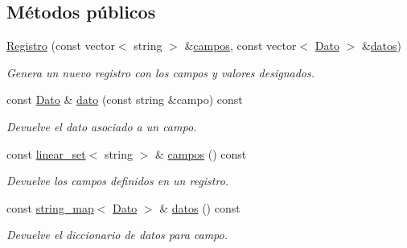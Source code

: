\subsection*{Métodos públicos}
\begin{DoxyCompactItemize}
\item 
\hyperlink{classRegistro_af3717314d0e658a463ffd8ac5b073441}{Registro} (const vector$<$ string $>$ \&\hyperlink{classRegistro_af082664a69c70eb5d29dcad6522242fc}{campos}, const vector$<$ \hyperlink{classDato}{Dato} $>$ \&\hyperlink{classRegistro_a332ce24bb26d794783172cf9fc327b8b}{datos})
\begin{DoxyCompactList}\small\item\em Genera un nuevo registro con los campos y valores designados. \end{DoxyCompactList}\item 
const \hyperlink{classDato}{Dato} \& \hyperlink{classRegistro_a5191c0af2f375525601819cfbb477287}{dato} (const string \&campo) const 
\begin{DoxyCompactList}\small\item\em Devuelve el dato asociado a un campo. \end{DoxyCompactList}\item 
const \hyperlink{classlinear__set}{linear\-\_\-set}$<$ string $>$ \& \hyperlink{classRegistro_af082664a69c70eb5d29dcad6522242fc}{campos} () const 
\begin{DoxyCompactList}\small\item\em Devuelve los campos definidos en un registro. \end{DoxyCompactList}\item 
const \hyperlink{classstring__map}{string\-\_\-map}$<$ \hyperlink{classDato}{Dato} $>$ \& \hyperlink{classRegistro_a332ce24bb26d794783172cf9fc327b8b}{datos} () const 
\begin{DoxyCompactList}\small\item\em Devuelve el diccionario de datos para campo. \end{DoxyCompactList}\end{DoxyCompactItemize}
